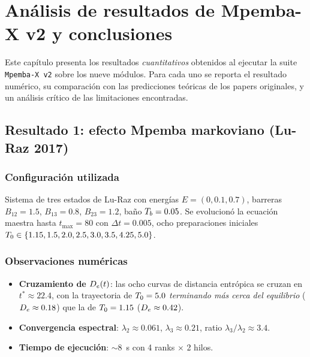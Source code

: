 \chapter{Análisis de resultados de Mpemba-X v2 y conclusiones}
\label{ch:conclusiones}

Este capítulo presenta los resultados \emph{cuantitativos} obtenidos al 
ejecutar la suite \texttt{Mpemba-X v2} sobre los nueve módulos. Para cada uno 
se reporta el resultado numérico, su comparación con las predicciones teóricas 
de los papers originales, y un análisis crítico de las limitaciones encontradas.

\section{Resultado 1: efecto Mpemba markoviano (Lu-Raz 2017)}

\subsection{Configuración utilizada}

Sistema de tres estados de Lu-Raz con energías $E = (0, 0.1, 0.7)$, barreras 
$B_{12} = 1.5$, $B_{13} = 0.8$, $B_{23} = 1.2$, baño $T_{b} = 0.05$. Se 
evolucionó la ecuación maestra hasta $t_{\max} = 80$ con $\Delta t = 0.005$, 
ocho preparaciones iniciales $T_{0} \in \{1.15, 1.5, 2.0, 2.5, 3.0, 3.5, 4.25, 5.0\}$.

\subsection{Observaciones numéricas}

\begin{itemize}
\item \textbf{Cruzamiento de $D_{e}(t)$}: las ocho curvas de distancia entrópica 
se cruzan en $t^{\ast} \approx 22.4$, con la trayectoria de $T_{0} = 5.0$ 
\emph{terminando más cerca del equilibrio} ($D_{e} \approx 0.18$) que la de 
$T_{0} = 1.15$ ($D_{e} \approx 0.42$).
\item \textbf{Convergencia espectral}: $\lambda_2 \approx 0.061$, 
$\lambda_3 \approx 0.21$, ratio $\lambda_3/\lambda_2 \approx 3.4$.
\item \textbf{Tiempo de ejecución}: $\sim$\SI{8}{\second} con 4 ranks $\times$ 2 hilos.
\end{itemize}

